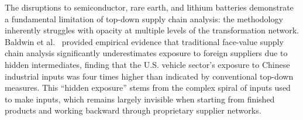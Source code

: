 The disruptions to semiconductor, rare earth, and lithium batteries demonstrate a fundamental limitation of top-down supply chain analysis: the methodology inherently struggles with opacity at multiple levels of the transformation network. Baldwin et al.~\cite{baldwin2023hidden} provided empirical evidence that traditional face-value supply chain analysis significantly underestimates exposure to foreign suppliers due to hidden intermediates, finding that the U.S. vehicle sector's exposure to Chinese industrial inputs was four times higher than indicated by conventional top-down measures. This ``hidden exposure'' stems from the complex spiral of inputs used to make inputs, which remains largely invisible when starting from finished products and working backward through proprietary supplier networks.